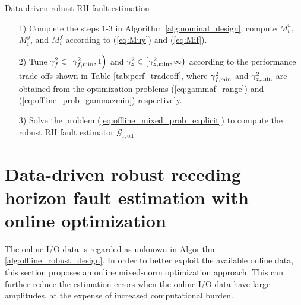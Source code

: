 \documentclass[twocolumn]{autart}
\begin{document}
\begin{algorithm}
  \caption{Data-driven robust RH fault estimation}
  \label{alg:offline_robust_design}
  \begin{algorithmic}
    \State
    \begin{enumerate}
      \item[1)] Complete the steps 1-3 in Algorithm \ref{alg:nominal_design}; compute $M_i^u$, $M_i^y$, and $M_i^f$ according to (\ref{eq:Muy}) and (\ref{eq:Mif}).
      \item[2)] Tune $\gamma_f^2 \in \left[ \gamma_{f,\rm{min}}^2, 1 \right)$ and $\gamma_z^2 \in \left[ \gamma_{z,\rm{min}}^2, \infty \right)$ according to the performance trade-offs shown in Table \ref{tab:perf_tradeoff}, where $\gamma_{f,\rm{min}}^2$ and $\gamma_{z,\rm{min}}^2$ are obtained from the optimization problems (\ref{eq:gammaf_range}) and (\ref{eq:offline_prob_gammazmin}) respectively.
      \item[3)] Solve the problem (\ref{eq:offline_mixed_prob_explicit}) to compute the robust RH fault estimator $\mathcal{G}_{\mathrm{r,off}}$.
    \end{enumerate}
  \end{algorithmic}
\end{algorithm}



\section{Data-driven robust receding horizon fault estimation with online optimization}\label{sect:dd_robust_onlineopt}
The online I/O data is regarded as unknown in Algorithm \ref{alg:offline_robust_design}. In order to better exploit the available online data, this section proposes an online mixed-norm optimization approach. This can further reduce the estimation errors when the online I/O data have large amplitudes, at the expense of increased computational burden.
\end{document}
